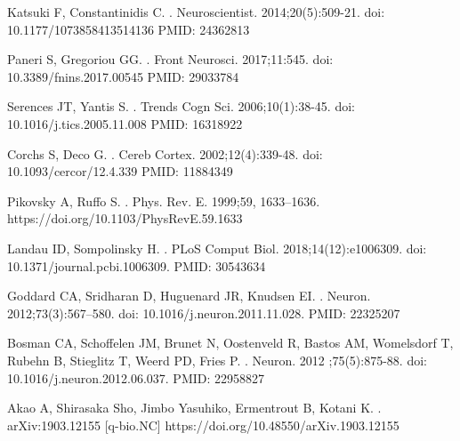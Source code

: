 \documentclass[10pt,letterpaper]{article}
\begin{document}
\begin{thebibliography}{10}

Katsuki F, Constantinidis C.
.
\newblock Neuroscientist. 2014;20(5):509-21. doi: 10.1177/1073858413514136 PMID: 24362813

Paneri S, Gregoriou GG.
.
\newblock Front Neurosci. 2017;11:545. doi: 10.3389/fnins.2017.00545 PMID: 29033784

Serences JT, Yantis S.
.
\newblock Trends Cogn Sci. 2006;10(1):38-45. doi: 10.1016/j.tics.2005.11.008 PMID: 16318922

Corchs S, Deco G.
.
\newblock Cereb Cortex. 2002;12(4):339-48. doi: 10.1093/cercor/12.4.339 PMID: 11884349

Pikovsky A,  Ruffo S.
.
\newblock Phys. Rev. E. 1999;59, 1633–1636. https://doi.org/10.1103/PhysRevE.59.1633

Landau ID, Sompolinsky H.
.
\newblock PLoS Comput Biol. 2018;14(12):e1006309. doi: 10.1371/journal.pcbi.1006309. PMID: 30543634

Goddard CA, Sridharan D, Huguenard JR, Knudsen EI.
.
\newblock Neuron. 2012;73(3):567–580. doi: 10.1016/j.neuron.2011.11.028. PMID: 22325207

Bosman CA, Schoffelen JM, Brunet N, Oostenveld R, Bastos AM, Womelsdorf T, Rubehn B, Stieglitz T, Weerd PD, Fries P.
.
\newblock Neuron. 2012 ;75(5):875-88. doi: 10.1016/j.neuron.2012.06.037. PMID: 22958827

Akao A, Shirasaka Sho, Jimbo Yasuhiko, Ermentrout B, Kotani K.
.
\newblock 	arXiv:1903.12155 [q-bio.NC] https://doi.org/10.48550/arXiv.1903.12155


\end{thebibliography}
\end{document}
